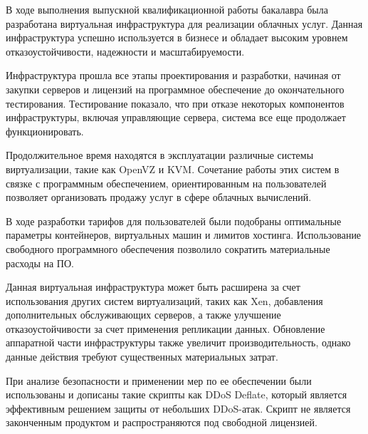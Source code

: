 
В ходе выполнения выпускной квалификационной работы бакалавра была разработана виртуальная инфраструктура для реализации облачных услуг.
Данная инфраструктура успешно используется в бизнесе и обладает высоким уровнем отказоустойчивости, надежности и масштабируемости.

Инфраструктура прошла все этапы проектирования и разработки, начиная от закупки серверов и лицензий на программное обеспечение до окончательного тестирования.
Тестирование показало, что при отказе некоторых компонентов инфраструктуры, включая управляющие сервера, система все еще продолжает функционировать.

Продолжительное время находятся в эксплуатации различные системы виртуализации, такие как OpenVZ и KVM.
Сочетание работы этих систем в связке с программным обеспечением, ориентированным на пользователей позволяет организовать продажу услуг в сфере облачных вычислений.

В ходе разработки тарифов для пользователей были подобраны оптимальные параметры контейнеров, виртуальных машин и лимитов хостинга.
Использование свободного программного обеспечения позволило сократить материальные расходы на ПО.

Данная виртуальная инфраструктура может быть расширена за счет использования других систем виртуализаций, таких как Xen, добавления дополнительных обслуживающих серверов, а также улучшение отказоустойчивости за счет применения репликации данных.
Обновление аппаратной части инфраструктуры также увеличит производительность, однако данные действия требуют существенных материальных затрат.

При анализе безопасности и применении мер по ее обеспечении были использованы и дописаны такие скрипты как DDoS Deflate, который является эффективным решением защиты от небольших DDoS-атак.
Скрипт не является законченным продуктом и распространяются под свободной лицензией.

\clearpage
